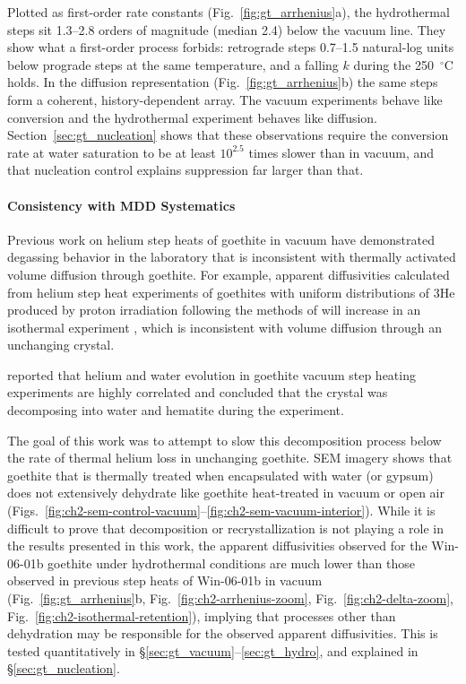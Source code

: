 Plotted as first-order rate constants (Fig.~\ref{fig:gt_arrhenius}a), the hydrothermal steps sit
1.3--2.8 orders of magnitude (median 2.4) below the vacuum line. They show what a first-order
process forbids: retrograde steps 0.7--1.5 natural-log units below prograde steps at the same
temperature, and a falling $k$ during the 250~$^\circ$C holds. In the diffusion representation
(Fig.~\ref{fig:gt_arrhenius}b) the same steps form a coherent, history-dependent array. The
vacuum experiments behave like conversion and the hydrothermal experiment behaves like
diffusion. Section~\ref{sec:gt_nucleation} shows that these observations require the conversion
rate at water saturation to be at least $10^{2.5}$ times slower than in vacuum, and that
nucleation control explains suppression far larger than that.



\paragraph{Consistency with MDD
Systematics}\label{consistency-with-mdd-systematics}

Previous work on helium step heats of goethite in vacuum have
demonstrated degassing behavior in the laboratory that is inconsistent
with thermally activated volume diffusion through goethite. For example,
apparent diffusivities calculated from helium step heat experiments of
goethites with uniform distributions of 3He produced by proton
irradiation following the methods of \citet{shuster2004} will increase
in an isothermal experiment \citep{farley2024}, which is inconsistent
with volume diffusion through an unchanging crystal.

\citet{farley2024} reported that helium and water evolution in goethite
vacuum step heating experiments are highly correlated and concluded that
the crystal was decomposing into water and hematite during the
experiment.

The goal of this work was to attempt to slow this decomposition process
below the rate of thermal helium loss in unchanging goethite. SEM
imagery shows that goethite that is thermally treated when encapsulated
with water (or gypsum) does not extensively dehydrate like
goethite heat-treated in vacuum or open air (Figs.~\ref{fig:ch2-sem-control-vacuum}--\ref{fig:ch2-sem-vacuum-interior}). While it is
difficult to prove that decomposition or recrystallization is not
playing a role in the results presented in this work, the apparent
diffusivities observed for the Win-06-01b goethite under hydrothermal
conditions are much lower than those observed in previous step heats of
Win-06-01b in vacuum (Fig.~\ref{fig:gt_arrhenius}b, Fig.~\ref{fig:ch2-arrhenius-zoom}, Fig.~\ref{fig:ch2-delta-zoom}, Fig.~\ref{fig:ch2-isothermal-retention}), implying that
processes other than dehydration may be responsible for the observed
apparent diffusivities. This is tested quantitatively in
\S\ref{sec:gt_vacuum}--\ref{sec:gt_hydro}, and explained in \S\ref{sec:gt_nucleation}.

